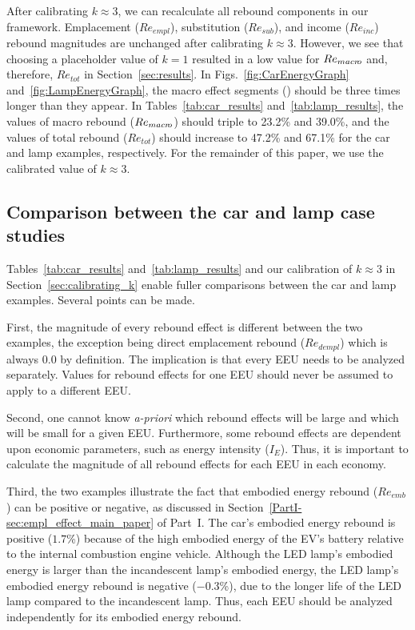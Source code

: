 \documentclass[12pt]{article}\usepackage[]{graphicx}\usepackage[]{xcolor}
\begin{document}
After calibrating $k \approx 3$, 
we can recalculate all rebound components in our framework.
Emplacement ($Re_{empl}$), substitution ($Re_{sub}$), and income ($Re_{inc}$) rebound
magnitudes are unchanged after calibrating $k \approx 3$.
However, we see that choosing a placeholder value of $k = 1$
resulted in a low value for $Re_{macr\!o}$ and, therefore, $Re_{tot}$
in Section~\ref{sec:results}.
In Figs.~\ref{fig:CarEnergyGraph} and~\ref{fig:LampEnergyGraph},
the macro effect segments (\bartilde{})
should be three times longer than they appear.
In Tables~\ref{tab:car_results} and~\ref{tab:lamp_results},
the values of macro rebound ($Re_{macr\!o}$) should triple to
23.2\% and
39.0\%, and
the values of total rebound ($Re_{tot}$) should increase to 
47.2\% and
67.1\%
for the car and lamp examples,
respectively.
For the remainder of this paper, 
we use the calibrated value of $k \approx 3$.


\subsection{Comparison between the car and lamp case studies}
\label{sec:case_study_comparison}



Tables~\ref{tab:car_results} and~\ref{tab:lamp_results}
and our calibration of $k \approx 3$ in Section~\ref{sec:calibrating_k} 
enable fuller comparisons between the car and lamp examples. 
Several points can be made.

First, 
the magnitude of every rebound effect is different between the two examples, 
the exception being direct emplacement rebound ($Re_{dempl}$)
which is always 0.0 by definition.
The implication is that every EEU needs to be analyzed separately. 
Values for rebound effects  
for one EEU should never be assumed to apply to a different EEU.

Second, 
one cannot know \emph{a-priori} which rebound effects
will be large and which will be small
for a given EEU.
Furthermore, some rebound effects are dependent upon economic parameters,
such as energy intensity ($I_E$).
Thus, it is important to calculate the magnitude of all rebound effects 
for each EEU in each economy.

Third,
the two examples illustrate the fact that 
embodied energy rebound ($Re_{emb}$) can be positive or negative,
as discussed in Section~\ref{PartI-sec:empl_effect_main_paper} of Part~I.
The car's embodied energy rebound is positive ($1.7$\%) 
because of the high embodied energy of the EV's battery
relative to the internal combustion engine vehicle. 
Although the LED lamp's embodied energy is larger than the 
incandescent lamp's embodied energy, 
the LED lamp's embodied energy rebound is negative ($-0.3$\%),
due to the longer life of the LED lamp compared to the incandescent lamp.
Thus, each EEU should be analyzed independently for its embodied energy rebound.
\end{document}
